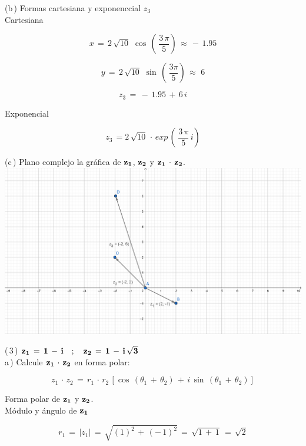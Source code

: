 \documentclass[a4paper,11pt,openany]{book}
\begin{document}
\textcolor{ao(english)}{(b\,)} Formas cartesiana y exponenccial $z_{3}$\\

\textcolor{ao(english)}{} Cartesiana

$$x\,=\,2\,\sqrt{10}\,\,\cos\,\left(\,\dfrac{3\,\pi}{5}\right)\,\approx\,-\,1.95$$

$$y\,=\,2\,\sqrt{10}\,\,\sin\,\left(\,\dfrac{3\pi}{5}\right)\,\approx\,\,6$$

$$z_{3}\,=\,-\,1.95\,+\,6\,i$$

\textcolor{ao(english)}{} Exponencial

$$z_{3}\,=2\,\sqrt{10}\,\cdot\,exp\,\left(\,\dfrac{3\,\pi}{5}\,i\right)$$

\textcolor{ao(english)}{(c\,)} Plano complejo la gráfica de $\bf{z_{1}}$, $\bf{z_{2}}$ y $\bf{z_{1}\,\cdot\,z_{2}}$.\\

\includegraphics[width=15cm]{Gra-Ej-2}

\textcolor{ao(english)}{(\,3\,)} $\bf{z_{1}\,=\,1\,-\,i \quad;\quad z_{2}\,=\,1\,-\,i\,\sqrt{3}}$\\

\textcolor{ao(english)}{a\,)} Calcule $\bf{z_{1}\,\cdot\,z_{2}}$ en forma polar:

$$z_{1}\,\cdot\,z_{2}\,=\,r_{1}\,\cdot\,r_{2}\,\left[\cos\,(\theta_{1}\,+\,\theta_{2})\,+\,i\,\sin\,(\theta_{1}\,+\,\theta_{2})\right]$$

\textcolor{ao(english)}{} Forma polar de $\bf{z_{1}}$ y $\bf{z_{2}}$.\\

\textcolor{ao(english)}{} Módulo y ángulo de $\bf{z_{1}}$ 

$$r_{1}\,=\,|z_{1}|\,=\,\sqrt{(1)^{2}\,+\,(-\,1)^{2}}\,=\,\sqrt{1\,+\,1}\,=\,\sqrt{2}$$
\end{document}
